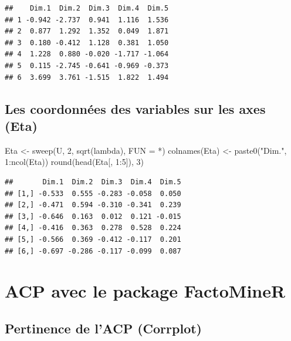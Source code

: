 \documentclass[
]{article}
\newenvironment{Shaded}{\begin{snugshade}}{\end{snugshade}}
\newcommand{\AttributeTok}[1]{\textcolor[rgb]{0.77,0.63,0.00}{#1}}
\newcommand{\DecValTok}[1]{\textcolor[rgb]{0.00,0.00,0.81}{#1}}
\newcommand{\FunctionTok}[1]{\textcolor[rgb]{0.00,0.00,0.00}{#1}}
\newcommand{\NormalTok}[1]{#1}
\newcommand{\OtherTok}[1]{\textcolor[rgb]{0.56,0.35,0.01}{#1}}
\newcommand{\SpecialCharTok}[1]{\textcolor[rgb]{0.00,0.00,0.00}{#1}}
\newcommand{\StringTok}[1]{\textcolor[rgb]{0.31,0.60,0.02}{#1}}
\begin{document}
\begin{verbatim}
##    Dim.1  Dim.2  Dim.3  Dim.4  Dim.5
## 1 -0.942 -2.737  0.941  1.116  1.536
## 2  0.877  1.292  1.352  0.049  1.871
## 3  0.180 -0.412  1.128  0.381  1.050
## 4  1.228  0.880 -0.020 -1.717 -1.064
## 5  0.115 -2.745 -0.641 -0.969 -0.373
## 6  3.699  3.761 -1.515  1.822  1.494
\end{verbatim}

\hypertarget{les-coordonnuxe9es-des-variables-sur-les-axes-eta}{%
\subsection{Les coordonnées des variables sur les axes
(Eta)}\label{les-coordonnuxe9es-des-variables-sur-les-axes-eta}}

\begin{Shaded}
\begin{Highlighting}[]
\NormalTok{Eta }\OtherTok{\textless{}{-}} \FunctionTok{sweep}\NormalTok{(U, }\DecValTok{2}\NormalTok{, }\FunctionTok{sqrt}\NormalTok{(lambda), }\AttributeTok{FUN =} \StringTok{\textquotesingle{}*\textquotesingle{}}\NormalTok{)}
\FunctionTok{colnames}\NormalTok{(Eta) }\OtherTok{\textless{}{-}} \FunctionTok{paste0}\NormalTok{(}\StringTok{"Dim."}\NormalTok{, }\DecValTok{1}\SpecialCharTok{:}\FunctionTok{ncol}\NormalTok{(Eta))}
\FunctionTok{round}\NormalTok{(}\FunctionTok{head}\NormalTok{(Eta[, }\DecValTok{1}\SpecialCharTok{:}\DecValTok{5}\NormalTok{]), }\DecValTok{3}\NormalTok{)}
\end{Highlighting}
\end{Shaded}

\begin{verbatim}
##       Dim.1  Dim.2  Dim.3  Dim.4  Dim.5
## [1,] -0.533  0.555 -0.283 -0.058  0.050
## [2,] -0.471  0.594 -0.310 -0.341  0.239
## [3,] -0.646  0.163  0.012  0.121 -0.015
## [4,] -0.416  0.363  0.278  0.528  0.224
## [5,] -0.566  0.369 -0.412 -0.117  0.201
## [6,] -0.697 -0.286 -0.117 -0.099  0.087
\end{verbatim}

\hypertarget{acp-avec-le-package-factominer}{%
\section{ACP avec le package
FactoMineR}\label{acp-avec-le-package-factominer}}

\hypertarget{pertinence-de-lacp-corrplot}{%
\subsection{Pertinence de l'ACP
(Corrplot)}\label{pertinence-de-lacp-corrplot}}
\end{document}

